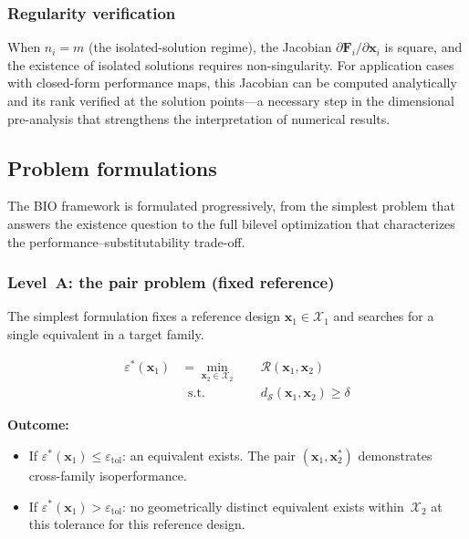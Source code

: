 \subsubsection{Regularity verification}
\label{sec:regularity}

When $n_i = m$ (the isolated-solution regime), the Jacobian $\partial \mathbf{F}_i / \partial \mathbf{x}_i$ is square, and the existence of isolated solutions requires non-singularity. For application cases with closed-form performance maps, this Jacobian can be computed analytically and its rank verified at the solution points---a necessary step in the dimensional pre-analysis that strengthens the interpretation of numerical results.


\subsection{Problem formulations}
\label{sec:formulations}

The BIO framework is formulated progressively, from the simplest problem that answers the existence question to the full bilevel optimization that characterizes the performance--substitutability trade-off.


\subsubsection{Level~A: the pair problem (fixed reference)}
\label{sec:pair}

The simplest formulation fixes a reference design $\mathbf{x}_1 \in \mathcal{X}_1$ and searches for a single equivalent in a target family.

\begin{subequations}
\label{eq:pair_problem}
\begin{alignat}{2}
    \varepsilon^*(\mathbf{x}_1)
    &= \min_{\mathbf{x}_2 \in \mathcal{X}_2}\;
    && \mathcal{R}(\mathbf{x}_1, \mathbf{x}_2) \\
    &\;\;\text{s.t.}\;
    && d_{\mathcal{S}}(\mathbf{x}_1, \mathbf{x}_2) \geq \delta
\end{alignat}
\end{subequations}

\noindent\textbf{Outcome:}
\begin{itemize}
    \item If $\varepsilon^*(\mathbf{x}_1) \leq \varepsilon_{\mathrm{tol}}$: an equivalent exists. The pair $(\mathbf{x}_1, \mathbf{x}_2^*)$ demonstrates cross-family isoperformance.
    \item If $\varepsilon^*(\mathbf{x}_1) > \varepsilon_{\mathrm{tol}}$: no geometrically distinct equivalent exists within~$\mathcal{X}_2$ at this tolerance for this reference design.
\end{itemize}

